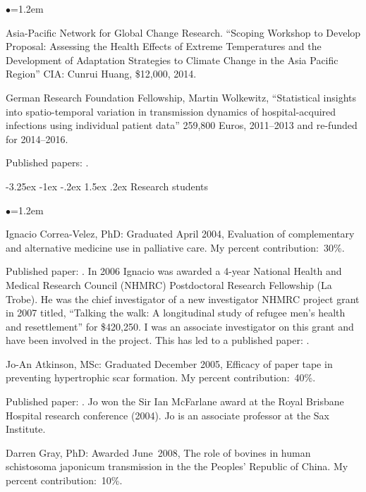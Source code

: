 \documentclass[a4paper,11pt]{article}
\makeatletter
\renewcommand\subsection{\@startsection{subsection}{2}{\z@}%
                                       {-3.25ex \@plus -1ex \@minus -.2ex}%
                                       {1.5ex \@plus .2ex}%
                                   {\normalfont\normalsize\bfseries\color{blue}}}
\renewcommand{\labelitemi}{$\bullet$}
\makeatother
\begin{document}
\begin{raggedright}
\begin{list}{\labelitemi}{\leftmargin=1.2em}
\item Asia-Pacific Network for Global Change Research. ``Scoping Workshop to Develop Proposal: Assessing the Health Effects of Extreme Temperatures and the Development of Adaptation Strategies to Climate Change in the Asia Pacific Region'' CIA: Cunrui Huang, \$12,000, 2014.

\item German Research Foundation Fellowship, Martin Wolkewitz, ``Statistical insights into spatio-temporal variation in transmission dynamics of hospital-acquired infections using individual patient data'' 259,800
Euros, 2011--2013 and re-funded for 2014--2016.

    Published papers: .


\end{list}

\subsection{Research students}

\begin{list}{\labelitemi}{\leftmargin=1.2em}\addtolength{\itemsep}{-0.5\baselineskip}
\item Ignacio Correa-Velez, PhD: Graduated April 2004, Evaluation of complementary and alternative medicine use in palliative care. My percent contribution:~30\%.

Published paper: . In 2006 Ignacio was awarded a 4-year National Health and Medical Research Council (NHMRC) Postdoctoral Research Fellowship (La Trobe). He was the chief investigator of a new investigator NHMRC project grant in 2007 titled, ``Talking the walk: A longitudinal study of refugee men's health and resettlement'' for \$420,250. I was an associate investigator on this grant and have been involved in the project. This has led to a published paper: .

\item Jo-An Atkinson, MSc: Graduated December 2005, Efficacy of paper tape in preventing hypertrophic scar formation. My percent contribution:~40\%.

Published paper: . Jo won the Sir Ian McFarlane award at the Royal Brisbane Hospital research conference (2004). Jo is an associate professor at the Sax Institute.

\item Darren Gray, PhD: Awarded June~2008, The role of bovines in human schistosoma japonicum transmission in the the Peoples' Republic of China. My percent contribution:~10\%.


\end{list}
\end{raggedright}
\end{document}

